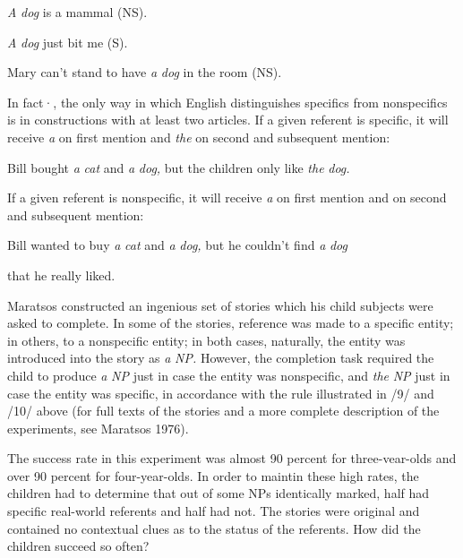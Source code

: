 \ea\label{ex:6}
 \textit{A} \textit{dog} is a mammal (NS).
\glt
\z


\ea\label{ex:7}
\textit{A} \textit{dog} just bit me (S).
\glt
\z

\ea\label{ex:8}
 Mary can't stand to have \textit{a} \textit{dog} in the room (NS).
\glt
\z

In fact·, the only way in which English distinguishes specifics from nonspecifics is in constructions with at least two articles. If a given referent is specific, it will receive \textit{a} on first mention and \textit{the} on second and subsequent mention:

\ea\label{ex:9}
 Bill bought \textit{a} \textit{cat} and \textit{a} \textit{dog,} but the children only like \textit{the} \textit{dog.}
\glt
\z

If a given referent is nonspecific, it will receive \textit{a} on first mention and on second and subsequent mention:

\ea\label{ex:10}
 Bill wanted to buy \textit{a} \textit{cat} and \textit{a} \textit{dog,} but he couldn't find \textit{a} \textit{dog}
\glt
\z

that he really liked.

Maratsos constructed an ingenious set of stories which his child subjects were asked to complete. In some of the stories, reference was made to a specific entity; in others, to a nonspecific entity; in both cases, naturally, the entity was introduced into the story as \textit{a} \textit{N}\textit{P.} However, the completion task required the child to produce \textit{a} \textit{NP} just in case the entity was nonspecific, and \textit{the} \textit{NP} just in case the entity was specific, in accordance with the rule illustrated in /9/ and /10/ above (for full texts of the stories and a more complete description of the experiments, see Maratsos 1976).

The success rate in this experiment was almost 90 percent for three-vear-olds and over 90 percent for four-year-olds. In order to maintin these high rates, the children had to determine that out of some NPs identically marked, half had specific real-world referents and half had not. The stories were original and contained no contextual clues as to the status of the referents. How did the children succeed so often?

